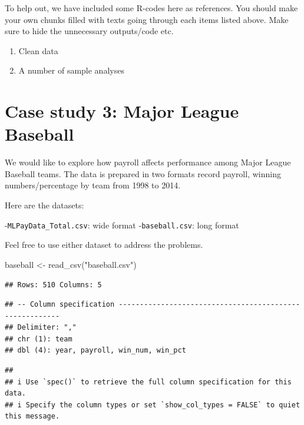 \documentclass[
]{article}
\newenvironment{Shaded}{\begin{snugshade}}{\end{snugshade}}
\newcommand{\FunctionTok}[1]{\textcolor[rgb]{0.00,0.00,0.00}{#1}}
\newcommand{\NormalTok}[1]{#1}
\newcommand{\OtherTok}[1]{\textcolor[rgb]{0.56,0.35,0.01}{#1}}
\newcommand{\StringTok}[1]{\textcolor[rgb]{0.31,0.60,0.02}{#1}}
\begin{document}
To help out, we have included some R-codes here as references. You
should make your own chunks filled with texts going through each items
listed above. Make sure to hide the unnecessary outputs/code etc.

\begin{enumerate}
\def\labelenumi{\arabic{enumi}.}
\item
  Clean data
\item
  A number of sample analyses
\end{enumerate}

\hypertarget{case-study-3-major-league-baseball}{%
\section{Case study 3: Major League
Baseball}\label{case-study-3-major-league-baseball}}

We would like to explore how payroll affects performance among Major
League Baseball teams. The data is prepared in two formats record
payroll, winning numbers/percentage by team from 1998 to 2014.

Here are the datasets:

-\texttt{MLPayData\_Total.csv}: wide format -\texttt{baseball.csv}: long
format

Feel free to use either dataset to address the problems.

\begin{Shaded}
\begin{Highlighting}[]
\NormalTok{baseball }\OtherTok{\textless{}{-}} \FunctionTok{read\_csv}\NormalTok{(}\StringTok{"baseball.csv"}\NormalTok{)}
\end{Highlighting}
\end{Shaded}

\begin{verbatim}
## Rows: 510 Columns: 5
\end{verbatim}

\begin{verbatim}
## -- Column specification --------------------------------------------------------
## Delimiter: ","
## chr (1): team
## dbl (4): year, payroll, win_num, win_pct
\end{verbatim}

\begin{verbatim}
## 
## i Use `spec()` to retrieve the full column specification for this data.
## i Specify the column types or set `show_col_types = FALSE` to quiet this message.
\end{verbatim}
\end{document}
